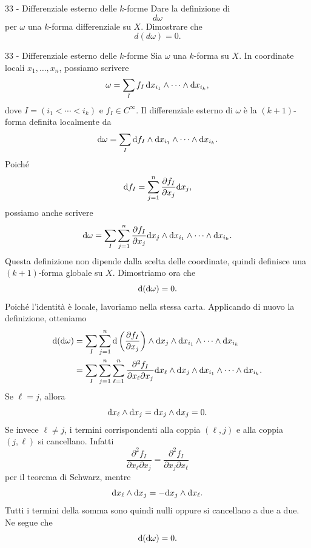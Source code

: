\documentclass[a4paper]{article}
\begin{document}
\begin{snippetexercise}{33 - Differenziale esterno delle \(k\)-forme}
    Dare la definizione di
    \[
        d\omega
    \]
    per \(\omega\) una \(k\)-forma differenziale su \(X\). Dimostrare che
    \[
        d(d\omega)=0.
    \]
\end{snippetexercise}

\begin{snippetsolution}{33 - Differenziale esterno delle \(k\)-forme}
    Sia \(\omega\) una \(k\)-forma su \(X\). In coordinate locali \(x_1,\ldots,x_n\), possiamo scrivere
    \[
        \omega
        =
        \sum_{I} f_I\,\text d x_{i_1}\wedge\cdots\wedge \text d x_{i_k},
    \]
    dove \(I=(i_1<\cdots<i_k)\) e \(f_I\in C^\infty\). Il differenziale esterno di \(\omega\) è la \((k+1)\)-forma definita localmente da
    \[
        \text d\omega
        =
        \sum_I \text d f_I\wedge \text d x_{i_1}\wedge\cdots\wedge \text d x_{i_k}.
    \]
    Poiché
    \[
        \text d f_I
        =
        \sum_{j=1}^n
        \frac{\partial f_I}{\partial x_j}\text d x_j,
    \]
    possiamo anche scrivere
    \[
        \text d\omega
        =
        \sum_I\sum_{j=1}^n
        \frac{\partial f_I}{\partial x_j}
        \text d x_j\wedge \text d x_{i_1}\wedge\cdots\wedge \text d x_{i_k}.
    \]
    Questa definizione non dipende dalla scelta delle coordinate, quindi definisce una \((k+1)\)-forma globale su \(X\).
    Dimostriamo ora che
    \[
        \text d(\text d\omega)=0.
    \]
    Poiché l'identità è locale, lavoriamo nella stessa carta. Applicando di nuovo la definizione, otteniamo
    \begin{align*}
        \text d(\text d\omega)
        &=
        \sum_I\sum_{j=1}^n
        \text d\left(
            \frac{\partial f_I}{\partial x_j}
        \right)
        \wedge
        \text d x_j\wedge \text d x_{i_1}\wedge\cdots\wedge \text d x_{i_k}\\
        &=
        \sum_I\sum_{j=1}^n\sum_{\ell=1}^n
        \frac{\partial^2 f_I}{\partial x_\ell\partial x_j}
        \text d x_\ell\wedge \text d x_j
        \wedge
        \text d x_{i_1}\wedge\cdots\wedge \text d x_{i_k}.
    \end{align*}
    Se \(\ell=j\), allora
    \[
        \text d x_\ell\wedge \text d x_j
        =
        \text d x_j\wedge \text d x_j
        =
        0.
    \]
    Se invece \(\ell\neq j\), i termini corrispondenti alla coppia \((\ell,j)\) e alla coppia \((j,\ell)\) si cancellano. Infatti
    \[
        \frac{\partial^2 f_I}{\partial x_\ell\partial x_j}
        =
        \frac{\partial^2 f_I}{\partial x_j\partial x_\ell}
    \]
    per il teorema di Schwarz, mentre
    \[
        \text d x_\ell\wedge \text d x_j
        =
        -
        \text d x_j\wedge \text d x_\ell.
    \]
    Tutti i termini della somma sono quindi nulli oppure si cancellano a due a due. Ne segue che
    \[
        \text d(\text d\omega)=0.
    \]
\end{snippetsolution}
\end{document}
